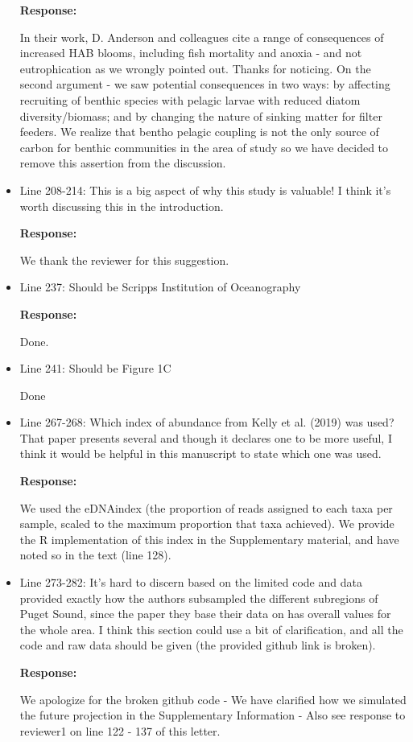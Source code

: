 \documentclass[11pt]{article}
\begin{document}
\begin{linenumbers}
\begin{itemize}
\textbf{Response:}

 In their work, D. Anderson and colleagues cite a range of consequences of increased HAB blooms, including fish mortality and anoxia - and not eutrophication as we wrongly pointed out. Thanks for noticing. On the second argument - we saw potential consequences in two ways: by affecting recruiting of benthic species with pelagic larvae with reduced diatom diversity/biomass; and by changing the nature of sinking matter for filter feeders. We realize that bentho pelagic coupling is not the only source of carbon for benthic communities in the area of study so we have decided to remove this assertion from the discussion.


\item{Line 208-214: This is a big aspect of why this study is valuable! I think it's worth discussing this in the introduction.}

\textbf{Response:}

 We thank the reviewer for this suggestion.


\item{Line 237: Should be Scripps Institution of Oceanography}

\textbf{Response:}

 Done.


\item{Line 241: Should be Figure 1C}

{\color{red} Done }


\item{Line 267-268: Which index of abundance from Kelly et al. (2019) was used? That paper presents several and though it declares one to be more useful, I think it would be helpful in this manuscript to state which one was used.}

\textbf{Response:}

We used the eDNAindex (the proportion of reads assigned to each taxa per sample, scaled to the maximum proportion that taxa achieved). We provide the R implementation of this index in the Supplementary material, and have noted so in the text (line 128).


\item{Line 273-282: It's hard to discern based on the limited code and data provided exactly how the authors subsampled the different subregions of Puget Sound, since the paper they base their data on has overall values for the whole area. I think this section could use a bit of clarification, and all the code and raw data should be given (the provided github link is broken).}

\textbf{Response:}

We apologize for the broken github code - We have clarified how we simulated the future projection in the Supplementary Information - Also see response to reviewer1 on line 122 - 137 of this letter.


\end{itemize}
 \end{linenumbers}
\end{document}
